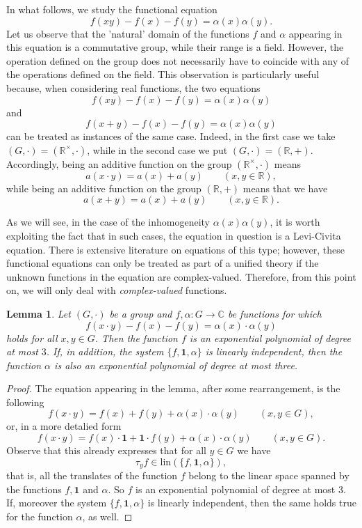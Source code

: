 \documentclass[a4paper,12pt]{article}
\theoremstyle{plain}
\newtheorem{lem}{Lemma}
\theoremstyle{definition}
\theoremstyle{remark}
\begin{document}
In what follows, we study the functional equation 
\[
 f(xy)-f(x)-f(y)= \alpha(x)\alpha(y). 
\]
Let us observe that the 'natural' domain of the functions $f$ and $\alpha$ appearing in this equation is a commutative group, while their range is a field. However, the operation defined on the group does not necessarily have to coincide with any of the operations defined on the field. This observation is particularly useful because, when considering real functions, the two equations
\[
 f(xy)-f(x)-f(y)= \alpha(x)\alpha(y)
\]
and 
\[
 f(x+y)-f(x)-f(y)= \alpha(x)\alpha(y)
\]
can be treated as instances of the same case. Indeed, in the first case we take $(G, \cdot)= (\mathbb{R}^{\times}, \cdot)$, while in the second case we put $(G, \cdot)= (\mathbb{R}, +)$.  Accordingly, being an additive function on the group $(\mathbb{R}^{\times}, \cdot)$ means 
\[
 a(x\cdot y)= a(x)+a(y) 
 \qquad 
 \left(x, y\in \mathbb{R}\right), 
\]
while being an additive function on the group $(\mathbb{R}, +)$ means that we have 
\[
 a(x+y)= a(x)+a(y) 
 \qquad 
 \left(x, y\in \mathbb{R}\right). 
\]



As we will see, in the case of the inhomogeneity $\alpha(x)\alpha(y)$, it is worth exploiting the fact that in such cases, the equation in question is a Levi-Civita equation. There is extensive literature on equations of this type; however, these functional equations can only be treated as part of a unified theory if the unknown functions in the equation are complex-valued. Therefore, from this point on, we will only deal with \emph{complex-valued} functions. 




\begin{lem}\label{lem_exp_sol}
 Let $(G, \cdot)$ be a group and $f, \alpha \colon G\to \mathbb{C}$ be functions for which 
 \[
  f(x\cdot y)-f(x)-f(y)= \alpha(x)\cdot \alpha(y)
 \]
holds for all $x, y\in G$. Then the function $f$ is an exponential polynomial of degree at most $3$. If, in addition, the system $\{ f, \mathbf{1}, \alpha\}$ is linearly independent, then the function $\alpha$ is also an exponential polynomial of degree at most three.
\end{lem}

\begin{proof}
 The equation appearing in the lemma, after some rearrangement, is the following 
 \[
  f(x\cdot y)=f(x)+f(y)+\alpha(x)\cdot \alpha(y) 
  \qquad 
  \left(x, y\in G\right), 
 \]
or, in a more detalied form 
\[
  f(x\cdot y)=f(x)\cdot \mathbf{1}+\mathbf{1}\cdot f(y)+\alpha(x)\cdot \alpha(y) 
  \qquad 
  \left(x, y\in G\right). 
\]
Observe that this already expresses that for all $y\in G$ we have 
\[
 \tau_{y}f \in \mathrm{lin}(\{f, \mathbf{1}, \alpha \}), 
\]
that is, all the translates of the function $f$ belong to the linear space spanned by the functions $f, \mathbf{1}$ and $\alpha$. So $f$ is an exponential polynomial of degree at most $3$. If, moreover the system  $\{ f, \mathbf{1}, \alpha\}$ is linearly independent, then the same holds true for the function $\alpha$, as well. 
\end{proof}
\end{document}
